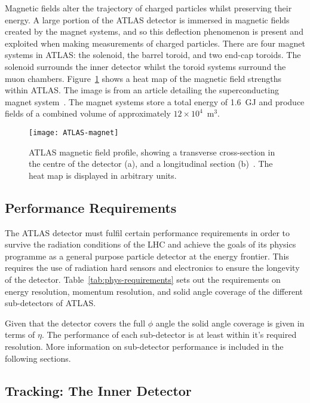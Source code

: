 Magnetic fields alter the trajectory of charged particles whilst preserving
their energy. A large portion of the ATLAS detector is immersed in magnetic
fields created by the magnet systems, and so this deflection phenomenon is
present and exploited when making measurements of charged particles. There are
four magnet systems in ATLAS: the solenoid, the barrel toroid, and two end-cap
toroids. The solenoid surrounds the inner detector whilst the toroid systems
surround the muon chambers. Figure~\ref{fig:ATLAS-magnets} shows a heat map of
the magnetic field strengths within ATLAS. The image is from an article
detailing the superconducting magnet system~\cite{ATLAS-magnets}. The magnet
systems store a total energy of 1.6~GJ and produce fields of a combined volume
of approximately $12\times 10^4$~m$^3$.
\begin{figure}[ht] \centering \texttt{[image: ATLAS-magnet]}
  \caption[ATLAS magnetic field]{ATLAS magnetic field profile, showing a
transverse cross-section in the centre of the detector (a), and a longitudinal
section (b)~\cite{ATLAS-magnets}. The heat map is displayed in arbitrary
units.}%
  \label{fig:ATLAS-magnets}
\end{figure}

\clearpage
\newpage

\subsection{Performance Requirements}

The ATLAS detector must fulfil certain performance requirements in order to
survive the radiation conditions of the LHC and achieve the goals of its physics
programme as a general purpose particle detector at the energy frontier.
This requires the use of radiation hard sensors and electronics to ensure the
longevity of the detector. Table~\ref{tab:phys-requirements} sets out the
requirements on energy resolution, momentum resolution, and solid angle coverage
of the different sub-detectors of ATLAS.

Given that the detector covers the full $\phi$ angle the solid angle coverage is
given in terms of $\eta$. The performance of each sub-detector is at least
within it's required resolution. More information on sub-detector performance is
included in the following sections.

\subsection{Tracking: The Inner Detector}%
\label{sec:id}

